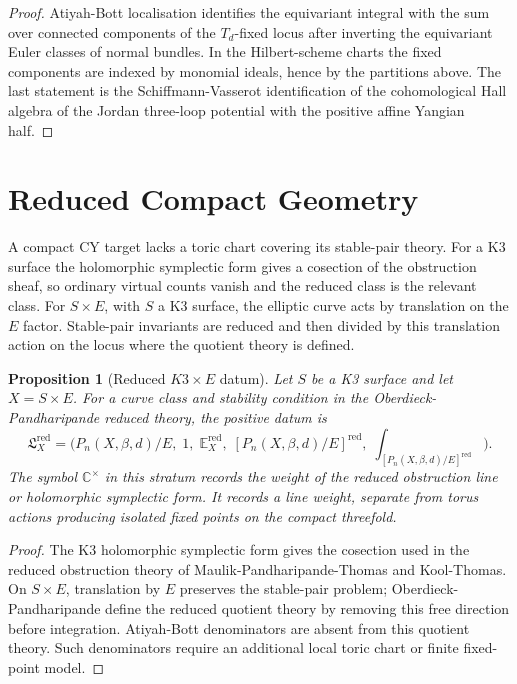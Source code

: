 \documentclass[11pt]{amsart}
\providecommand{\C}{\mathbb{C}}
\theoremstyle{plain}
\newtheorem{proposition}[theorem]{Proposition}
\theoremstyle{definition}
\theoremstyle{remark}
\begin{document}
\begin{proof}
Atiyah-Bott localisation identifies the equivariant integral with the
sum over connected components of the $T_d$-fixed locus after inverting
the equivariant Euler classes of normal bundles. In the Hilbert-scheme
charts the fixed components are indexed by monomial ideals, hence by the
partitions above. The last statement is the Schiffmann-Vasserot
identification of the cohomological Hall algebra of the Jordan
three-loop potential with the positive affine Yangian half.
\end{proof}

\section{Reduced Compact Geometry}

A compact CY target lacks a toric chart covering its stable-pair theory.
For a K3 surface the holomorphic symplectic form gives a cosection of
the obstruction sheaf, so ordinary virtual counts vanish and the reduced
class is the relevant class. For $S\times E$, with $S$ a K3 surface, the
elliptic curve acts by translation on the $E$ factor. Stable-pair
invariants are reduced and then divided by this translation action on
the locus where the quotient theory is defined.

\begin{proposition}[Reduced $K3\times E$ datum]\label{prop:k3e-reduced-datum}
Let $S$ be a K3 surface and let $X=S\times E$. For a curve class and
stability condition in the Oberdieck-Pandharipande reduced theory, the
positive datum is
\[
 \mathfrak L_X^{\mathrm{red}}
 =
 \bigl(P_n(X,\beta,d)/E,\;1,\;\mathbb E_X^{\mathrm{red}},\;
 [P_n(X,\beta,d)/E]^{\mathrm{red}},\;
 \int_{[P_n(X,\beta,d)/E]^{\mathrm{red}}}\bigr).
\]
The symbol $\C^\times$ in this stratum records the weight of the
reduced obstruction line or holomorphic symplectic form. It records a
line weight, separate from torus actions producing isolated fixed points
on the compact threefold.
\end{proposition}

\begin{proof}
The K3 holomorphic symplectic form gives the cosection used in the
reduced obstruction theory of Maulik-Pandharipande-Thomas and
Kool-Thomas. On $S\times E$, translation by $E$ preserves the
stable-pair problem; Oberdieck-Pandharipande define the reduced
quotient theory by removing this free direction before integration.
Atiyah-Bott denominators are absent from this quotient theory. Such
denominators require an additional local toric chart or finite
fixed-point model.
\end{proof}
\end{document}
